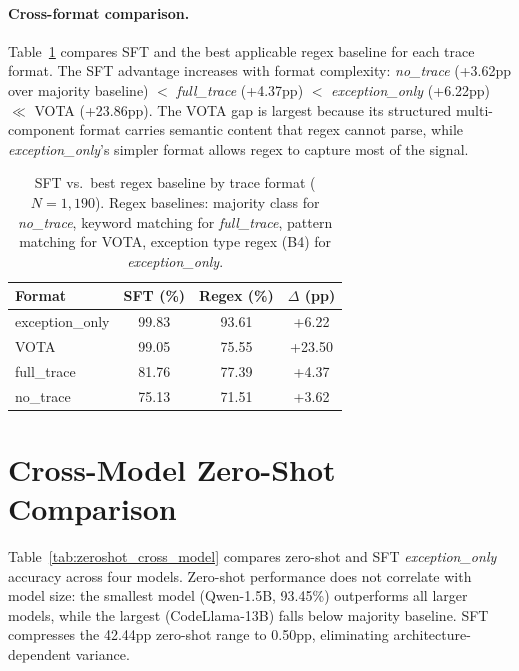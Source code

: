 \paragraph{Cross-format comparison.}
Table~\ref{tab:regex_cross_format} compares SFT and the best applicable regex baseline for each trace format.
The SFT advantage increases with format complexity: \textit{no\_trace} (+3.62pp over majority baseline) $<$ \textit{full\_trace} (+4.37pp) $<$ \textit{exception\_only} (+6.22pp) $\ll$ VOTA (+23.86pp).
The VOTA gap is largest because its structured multi-component format carries semantic content that regex cannot parse, while \textit{exception\_only}'s simpler format allows regex to capture most of the signal.

\begin{table}[h!]
\centering
\caption{SFT vs.\ best regex baseline by trace format ($N{=}1{,}190$). Regex baselines: majority class for \textit{no\_trace}, keyword matching for \textit{full\_trace}, pattern matching for VOTA, exception type regex (B4) for \textit{exception\_only}.}
\label{tab:regex_cross_format}
\small
\begin{tabular}{lccc}
\toprule
\textbf{Format} & \textbf{SFT (\%)} & \textbf{Regex (\%)} & \textbf{$\Delta$ (pp)} \\
\midrule
exception\_only & 99.83 & 93.61 & +6.22 \\
VOTA & 99.05 & 75.55 & +23.50 \\
full\_trace & 81.76 & 77.39 & +4.37 \\
no\_trace & 75.13 & 71.51 & +3.62 \\
\bottomrule
\end{tabular}
\end{table}

\section{Cross-Model Zero-Shot Comparison}
\label{sec:zeroshot_cross_model}

Table~\ref{tab:zeroshot_cross_model} compares zero-shot and SFT \textit{exception\_only} accuracy across four models.
Zero-shot performance does not correlate with model size: the smallest model (Qwen-1.5B, 93.45\%) outperforms all larger models, while the largest (CodeLlama-13B) falls below majority baseline.
SFT compresses the 42.44pp zero-shot range to 0.50pp, eliminating architecture-dependent variance.

